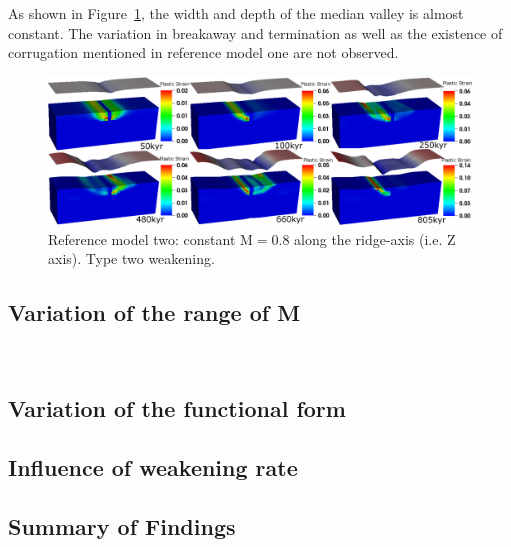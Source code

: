 As shown in Figure~\ref{fig_Results1_3}, the width and depth of the median valley is almost constant. The variation in breakaway and termination as well as the existence of corrugation mentioned in reference model one are not observed. 
\begin{figure}[H]
  \centering
    \includegraphics[width=1.0\textwidth]{fig_Results1_3.eps}
  \caption{Reference model two: constant M$=0.8$ along the ridge-axis (i.e. Z axis). Type two weakening.}
 \label{fig_Results1_3}
\end{figure}   


\subsection{Variation of the range of M}

\


\subsection{Variation of the functional form}

\subsection{Influence of weakening rate}

\subsection{Summary of Findings}
